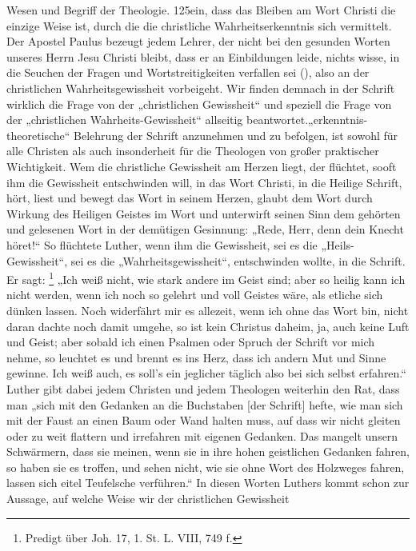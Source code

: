 Wesen und Begriff der Theologie. 125\n{} ein, dass das Bleiben am Wort Christi die einzige Weise ist, durch die die christliche Wahrheitserkenntnis sich vermittelt. Der Apostel Paulus bezeugt jedem Lehrer, der nicht bei den gesunden Worten unseres Herrn Jesu Christi bleibt, dass er an Einbildungen leide, nichts wisse, in die Seuchen der Fragen und Wortstreitigkeiten verfallen sei (), also an der christlichen Wahrheitsgewissheit vorbeigeht. Wir finden demnach in der Schrift wirklich die Frage von der „christlichen Gewissheit“ und speziell die Frage von der „christlichen Wahrheits-Gewissheit“ allseitig beantwortet.\n\nDie „erkenntnis-theoretische“ Belehrung der Schrift anzunehmen und zu befolgen, ist sowohl für alle Christen als auch insonderheit für die Theologen von großer praktischer Wichtigkeit. Wem die christliche Gewissheit am Herzen liegt, der flüchtet, sooft ihm die Gewissheit entschwinden will, in das Wort Christi, in die Heilige Schrift, hört, liest und bewegt das Wort in seinem Herzen, glaubt dem Wort durch Wirkung des Heiligen Geistes im Wort und unterwirft seinen Sinn dem gehörten und gelesenen Wort in der demütigen Gesinnung: „Rede, Herr, denn dein Knecht höret!“ So flüchtete Luther, wenn ihm die Gewissheit, sei es die „Heils-Gewissheit“, sei es die „Wahrheitsgewissheit“, entschwinden wollte, in die Schrift. Er sagt: \footnote{Predigt über Joh. 17, 1. St. L. VIII, 749 f.} „Ich weiß nicht, wie stark andere im Geist sind; aber so heilig kann ich nicht werden, wenn ich noch so gelehrt und voll Geistes wäre, als etliche sich dünken lassen. Noch widerfährt mir es allezeit, wenn ich ohne das Wort bin, nicht daran dachte noch damit umgehe, so ist kein Christus daheim, ja, auch keine Luft und Geist; aber sobald ich einen Psalmen oder Spruch der Schrift vor mich nehme, so leuchtet es und brennt es ins Herz, dass ich andern Mut und Sinne gewinne. Ich weiß auch, es soll’s ein jeglicher täglich also bei sich selbst erfahren.“ Luther gibt dabei jedem Christen und jedem Theologen weiterhin den Rat, dass man „sich mit den Gedanken an die Buchstaben [der Schrift] hefte, wie man sich mit der Faust an einen Baum oder Wand halten muss, auf dass wir nicht gleiten oder zu weit flattern und irrefahren mit eigenen Gedanken. Das mangelt unsern Schwärmern, dass sie meinen, wenn sie in ihre hohen geistlichen Gedanken fahren, so haben sie es troffen, und sehen nicht, wie sie ohne Wort des Holzweges fahren, lassen sich eitel Teufelsche verführen.“ In diesen Worten Luthers kommt schon zur Aussage, auf welche Weise wir der christlichen Gewissheit